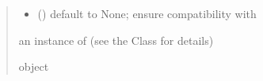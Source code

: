 \documentclass[letterpaper,10pt,english]{sphinxmanual}
\begin{document}
\begin{fulllineitems}
\begin{quote}
\begin{description}
\begin{itemize}
\item {} 
\sphinxAtStartPar
{} () \textendash{} default to None; ensure compatibility with 

\end{itemize}

\sphinxAtStartPar
an instance of  (see the Class for details)

\sphinxAtStartPar
object

\end{description}\end{quote}

\end{fulllineitems}

\end{document}
